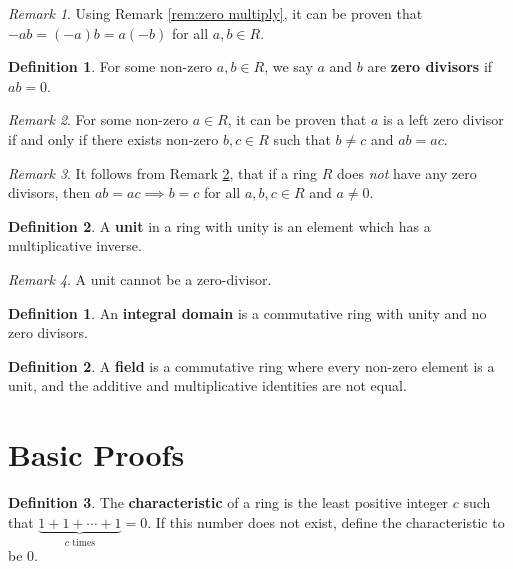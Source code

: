 \documentclass[parskip=half]{scrartcl}  %
\theoremstyle{definition}
\newtheorem{definition}{Definition}[section]
\newtheorem{subdefinition}{Definition}[definition]
\theoremstyle{plain}
\theoremstyle{remark}
\newtheorem{remark}{Remark}[definition]
\begin{document}
\begin{remark}
    Using Remark \ref{rem:zero multiply}, it can be proven that
    $-ab=(-a)b=a(-b)$ for all $a,b\in R$.
\end{remark}

\begin{subdefinition}
    For some non-zero $a,b\in R$, we say $a$ and $b$ are \textbf{zero divisors}
    if $ab=0$.
\end{subdefinition}

\begin{remark}
    \label{rem:zero divisor}
    For some non-zero $a\in R$, it can be proven that $a$ is a left zero
    divisor if and only if there exists non-zero $b,c\in R$ such that $b\neq c$
    and $ab=ac$.
\end{remark}

\begin{remark}
    It follows from Remark \ref{rem:zero divisor}, that if a ring $R$ does
    \textit{not} have any zero divisors, then $ab=ac\implies b=c$ for all
    $a,b,c\in R$ and $a\neq 0$.
\end{remark}

\begin{subdefinition}
    A \textbf{unit} in a ring with unity is an element which has a
    multiplicative inverse.
\end{subdefinition}

\begin{remark}
    A unit cannot be a zero-divisor.
\end{remark}

\begin{definition}
    An \textbf{integral domain} is a commutative ring with unity and no zero
    divisors.
\end{definition}

\begin{definition}
    A \textbf{field} is a commutative ring where every non-zero element is a
    unit, and the additive and multiplicative identities are not equal.
\end{definition}


\section{Basic Proofs}


\begin{definition}
    The \textbf{characteristic} of a ring is the least positive integer $c$
    such that $\underbrace{1+1+\cdots+1}_{c\text{ times}}=0$.
    If this number does not exist, define the characteristic to be 0.
\end{definition}
\end{document}
